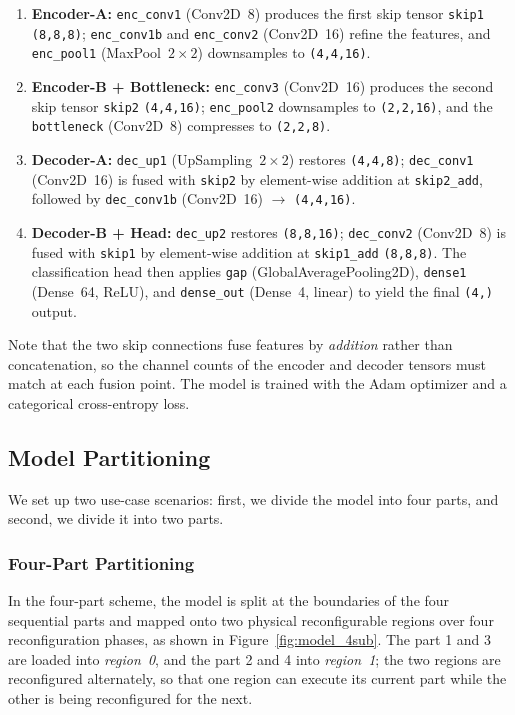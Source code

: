 \documentclass{cernatsnote}
\begin{document}
\begin{enumerate}
  \item \textbf{Encoder-A:} \texttt{enc\_conv1} (Conv2D~8) produces the first skip tensor \texttt{skip1} \texttt{(8,8,8)}; \texttt{enc\_conv1b} and \texttt{enc\_conv2} (Conv2D~16) refine the features, and \texttt{enc\_pool1} (MaxPool~$2\times2$) downsamples to \texttt{(4,4,16)}.
  \item \textbf{Encoder-B + Bottleneck:} \texttt{enc\_conv3} (Conv2D~16) produces the second skip tensor \texttt{skip2} \texttt{(4,4,16)}; \texttt{enc\_pool2} downsamples to \texttt{(2,2,16)}, and the \texttt{bottleneck} (Conv2D~8) compresses to \texttt{(2,2,8)}.
  \item \textbf{Decoder-A:} \texttt{dec\_up1} (UpSampling~$2\times2$) restores \texttt{(4,4,8)}; \texttt{dec\_conv1} (Conv2D~16) is fused with \texttt{skip2} by element-wise addition at \texttt{skip2\_add}, followed by \texttt{dec\_conv1b} (Conv2D~16) $\rightarrow$ \texttt{(4,4,16)}.
  \item \textbf{Decoder-B + Head:} \texttt{dec\_up2} restores \texttt{(8,8,16)}; \texttt{dec\_conv2} (Conv2D~8) is fused with \texttt{skip1} by element-wise addition at \texttt{skip1\_add} \texttt{(8,8,8)}. The classification head then applies \texttt{gap} (GlobalAveragePooling2D), \texttt{dense1} (Dense~64, ReLU), and \texttt{dense\_out} (Dense~4, linear) to yield the final \texttt{(4,)} output.
\end{enumerate}

Note that the two skip connections fuse features by \emph{addition} rather than concatenation, so the channel counts of the encoder and decoder tensors must match at each fusion point. The model is trained with the Adam optimizer and a categorical cross-entropy loss.


\subsection{Model Partitioning}

We set up two use-case scenarios: first, we divide the model into four parts, and second, we divide it into two parts.

\subsubsection{Four-Part Partitioning}

In the four-part scheme, the model is split at the boundaries of the four sequential parts and mapped onto two physical reconfigurable regions over four reconfiguration phases, as shown in Figure~\ref{fig:model_4sub}. The part 1 and 3 are loaded into \emph{region~0}, and the part 2 and 4 into \emph{region~1}; the two regions are reconfigured alternately, so that one region can execute its current part while the other is being reconfigured for the next. 
\end{document}
